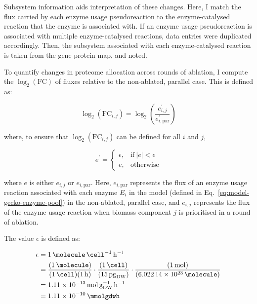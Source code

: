 Subsystem information aids interpretation of these changes.
Here, I match the flux carried by each enzyme usage pseudoreaction to the enzyme-catalysed reaction that the enzyme is associated with.
If an enzyme usage pseudoreaction is associated with multiple enzyme-catalysed reactions, data entries were duplicated accordingly.
Then, the subsystem associated with each enzyme-catalysed reaction is taken from the gene-protein map, and noted.

To quantify changes in proteome allocation across rounds of ablation, I compute the $\log_{2}(\mathrm{FC})$ of fluxes relative to the non-ablated, parallel case.
This is defined as:

\begin{equation}
  \log_{2}(\mathrm{FC}_{i,j}) = \log_{2}\left( \frac{e_{i,j}^{\prime}}{e_{i, \mathrm{par}}^{\prime}} \right)
  \label{eq:model-foldchange}
\end{equation}

where, to ensure that $\log_{2}(\mathrm{FC}_{i,j})$ can be defined for all $i$ and $j$,

\begin{equation}
  e^{\prime} =
  \begin{cases}
    \epsilon, & \text{if}\ |e|<\epsilon \\
    e, & \text{otherwise}
  \end{cases}
  \label{eq:model-epsilon-round}
\end{equation}

where $e$ is either $e_{i,j}$ or $e_{i, \mathrm{par}}$.
Here, $e_{i, \mathrm{par}}$ represents the flux of an enzyme usage reaction associated with each enzyme $E_{i}$ in the model (defined in Eq.\ \ref{eq:model-gecko-enzyme-pool}) in the non-ablated, parallel case, and $e_{i,j}$ represents the flux of the enzyme usage reaction when biomass component $j$ is prioritised in a round of ablation.

The value $\epsilon$ is defined as:

\begin{equation}
  \begin{aligned}
    \epsilon &= \SI{1}{\molecule~\cell^{-1}~\hour^{-1}}\\
             &= \frac{(\SI{1}{\molecule})}{(\SI{1}{\cell})(\SI{1}{\hour})} \cdot \frac{(\SI{1}{\cell})}{(\SI{15}{\pico\gram_{DW}})} \cdot \frac{(\SI{1}{\mol})}{(\SI{6.02214d23}{\molecule)}}\\
             &= \SI{1.11d-13}{\mol~\gram_{DW}^{-1}~\hour^{-1}}\\
             &= \SI{1.11d-10}{\mmolgdwh}\\
  \end{aligned}
  \label{eq:model-epsilon}
\end{equation}

